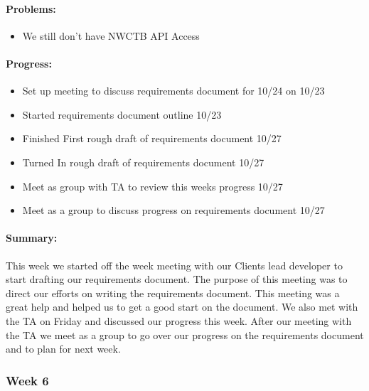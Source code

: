 \documentclass[onecolumn, draftclsnofoot,10pt, compsoc]{article}
\begin{document}
		    \paragraph{Problems:} \hfill \break
		        \begin{itemize}
		            \item We still don't have NWCTB API Access
		        \end{itemize}
		
		    \paragraph{Progress:} \hfill \break
		    
		    \begin{itemize}
		        \item Set up meeting to discuss requirements document for 10/24 on 10/23
		        \item Started requirements document outline 10/23
		        \item Finished First rough draft of requirements document 10/27
		        \item Turned In rough draft of requirements document 10/27
		        \item Meet as group with TA to review this weeks progress 10/27
		        \item Meet as a group to discuss progress on requirements document 10/27
		    \end{itemize}
		    
		    \paragraph{Summary:}
		        
		        This week we started off the week meeting with our Clients lead developer to start drafting our requirements document. The purpose of this meeting was to direct our efforts on writing the requirements document. This meeting was a great help and helped us to get a good start on the document.  We also met with the TA on Friday and discussed our progress this week. After our meeting with the TA we meet as a group to go over our progress on the requirements document and to plan for next week.\\
		
		\subsubsection{Week 6}
		
\end{document}
